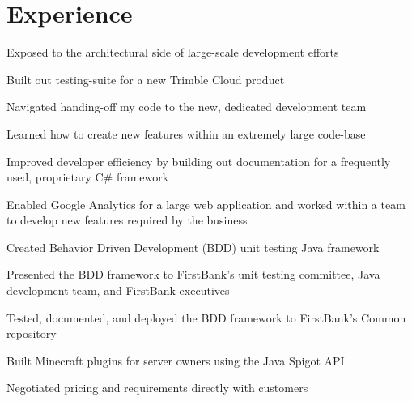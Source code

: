 \documentclass[]{darling-resume-openfont}
\begin{document}
\hfill
\begin{minipage}[t]{0.66\textwidth} 


\section{Experience}
\vspace{\topsep} %
\begin{tightemize}
\item Exposed to the architectural side of large-scale development efforts
\item Built out testing-suite for a new Trimble Cloud product
\item Navigated handing-off my code to the new, dedicated development team
\end{tightemize}
\sectionsep

\begin{tightemize}
\item Learned how to create new features within an extremely large code-base
\item Improved developer efficiency by building out documentation for a frequently used, proprietary C\#{} framework
\item Enabled Google Analytics for a large web application and worked within a team to develop new features required by the business
\end{tightemize}
\sectionsep

\begin{tightemize}
\item Created Behavior Driven Development (BDD) unit testing Java framework
\item Presented the BDD framework to FirstBank's unit testing committee, Java development team, and FirstBank executives
\item Tested, documented, and deployed the BDD framework to FirstBank's Common repository
\end{tightemize}
\sectionsep

\begin{tightemize}
\item Built Minecraft plugins for server owners using the Java Spigot API
\item Negotiated pricing and requirements directly with customers
\end{tightemize}
\sectionsep


\end{minipage}
\end{document}
